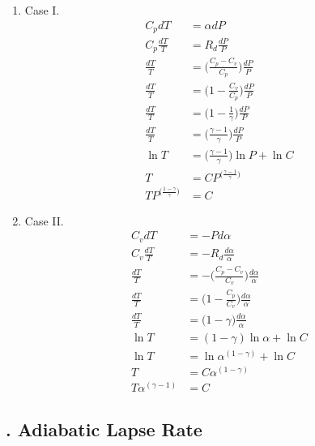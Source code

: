 \documentclass[fleqn,10pt]{SelfArx} %
\begin{document}
\begin{enumerate}
    \item Case I. 
        \begin{align}
            C_p dT &= \alpha dP  \\
            C_p \frac{dT}{T} &= R_d \frac{dP}{P}  \\
            \frac{dT}{T} &= \Big(\frac{C_p - C_v}{C_p}\Big) \frac{dP}{P}  \\
            \frac{dT}{T} &= \Big(1 - \frac{C_v}{C_p}\Big) \frac{dP}{P}  \\
            \frac{dT}{T} &= \Big(1 - \frac{1}{\gamma}\Big) \frac{dP}{P}  \\
            \frac{dT}{T} &= \Big(\frac{\gamma - 1}{\gamma}\Big) \frac{dP}{P} \\
            \ln T &= \Big(\frac{\gamma - 1}{\gamma}\Big) \ln P + \ln C \\
            T &= CP^{\big(\frac{\gamma - 1}{\gamma}\big)} \\
            T P^{\big(\frac{1 - \gamma}{\gamma}\big)} &= C
        \end{align}
    \item Case II. 
        \begin{align}
            C_v dT &= -P d\alpha  \\
            C_v \frac{dT}{T} &= -R_d \frac{d\alpha}{\alpha}  \\
            \frac{dT}{T} &= -\Big(\frac{C_p - C_v}{C_v}\Big) \frac{d\alpha}{\alpha} \\
            \frac{dT}{T} &= \Big(1 - \frac{C_p}{C_v}\Big) \frac{d\alpha}{\alpha} \\
            \frac{dT}{T} &= \Big(1 - \gamma\Big) \frac{d\alpha}{\alpha} \\
            \ln T &= (1 - \gamma)\ln \alpha + \ln C \\
            \ln T &= \ln \alpha^{(1 - \gamma)} + \ln C \\
            T &= C\alpha^{(1-\gamma)} \\
            T\alpha^{(\gamma - 1)} &= C
\end{align}
\end{enumerate}

\subsection{. Adiabatic Lapse Rate}
\end{document}
